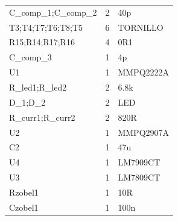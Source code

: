 \documentclass[a4paper,12pt,twoside]{article}
\begin{document}
\begin{table}[h!]
\begin{tabular}{@{}lll@{}}
C\_comp\_1;C\_comp\_2 & 2        & 40p       \\
T3;T4;T7;T6;T8;T5     & 6        & TORNILLO  \\
R15;R14;R17;R16       & 4        & 0R1       \\
C\_comp\_3            & 1        & 4p        \\
U1                    & 1        & MMPQ2222A \\
R\_led1;R\_led2       & 2        & 6.8k      \\
D\_1;D\_2             & 2        & LED       \\
R\_curr1;R\_curr2     & 2        & 820R      \\
U2                    & 1        & MMPQ2907A \\
C2                    & 1        & 47u       \\
U4                    & 1        & LM7909CT  \\
U3                    & 1        & LM7809CT  \\
Rzobel1               & 1        & 10R       \\
Czobel1               & 1        & 100n      \\ \bottomrule
\end{tabular}

\end{table}
\end{document}
